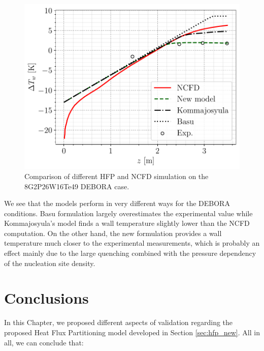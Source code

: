 \begin{figure}[!h]
\centering
\includegraphics[width=0.6\linewidth]{img/HFP/test_allHFPbbis_8Te44.pdf}
\caption{Comparison of different HFP and NCFD simulation on the 8G2P26W16Te49 DEBORA case.}
\label{fig:HFP_DEBORA}
\end{figure}

We see that the models perform in very different ways for the DEBORA conditions. Basu \etal formulation largely overestimates the experimental value while Kommajosyula's model finds a wall temperature slightly lower than the NCFD computation. On the other hand, the new formulation provides a wall temperature much closer to the experimental measurements, which is probably an effect mainly due to the large quenching combined with the pressure dependency of the nucleation site density.
%
%
%



\section{Conclusions}

In this Chapter, we proposed different aspects of validation regarding the proposed Heat Flux Partitioning model developed in Section \ref{sec:hfp_new}. All in all, we can conclude that:

